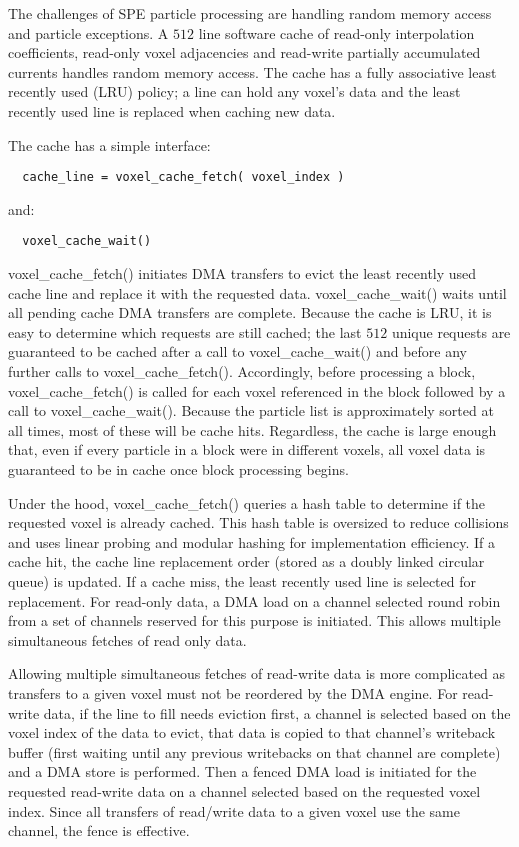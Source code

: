 \documentclass[letter,10pt]{article}
\begin{document}
The challenges of SPE particle processing are handling random
memory access and particle exceptions.  A $512$ line
software cache of read-only interpolation coefficients, read-only
voxel adjacencies and read-write partially accumulated currents
handles random memory access.  The cache has a fully associative
least recently used (LRU) policy; a line can hold any voxel's data and
the least recently used line is replaced when caching new data.

The cache has a simple interface:
\begin{verbatim}
  cache_line = voxel_cache_fetch( voxel_index )
\end{verbatim}
and:
\begin{verbatim}
  voxel_cache_wait()
\end{verbatim}

voxel\_cache\_fetch() initiates DMA transfers to evict the least
recently used cache line and replace it with the requested data.
voxel\_cache\_wait() waits until all pending cache DMA transfers are
complete.  Because the cache is LRU, it is easy to determine which
requests are still cached; the last $512$ unique requests are
guaranteed to be cached after a call to voxel\_cache\_wait() and before
any further calls to voxel\_cache\_fetch().  Accordingly, before processing
a block, voxel\_cache\_fetch() is called for each voxel referenced in
the block followed by a call to voxel\_cache\_wait().  Because the
particle list is approximately sorted at all times, most of these will
be cache hits.  Regardless, the cache is large enough that, even if
every particle in a block were in different voxels, all voxel data is
guaranteed to be in cache once block processing begins.

Under the hood, voxel\_cache\_fetch() queries a hash table to determine
if the requested voxel is already cached.  This hash table is
oversized to reduce collisions and uses linear probing and modular
hashing for implementation efficiency.  If a cache hit, the cache line
replacement order (stored as a doubly linked circular queue) is
updated.  If a cache miss, the least recently used line is selected
for replacement.  For read-only data, a DMA load on a channel selected
round robin from a set of channels reserved for this purpose is
initiated.  This allows multiple simultaneous fetches of read only
data.

Allowing multiple simultaneous fetches of read-write data is more
complicated as transfers to a given voxel must not be reordered by the
DMA engine.  For read-write data, if the line to fill needs
eviction first, a channel is selected based on the voxel index of the data
to evict, that data is copied to that channel's writeback buffer
(first waiting until any previous writebacks on that channel are
complete) and a DMA store is performed.  Then a fenced DMA load is
initiated for the requested read-write data on a channel selected
based on the requested voxel index.  Since all transfers of read/write
data to a given voxel use the same channel, the fence is effective.
\end{document}
